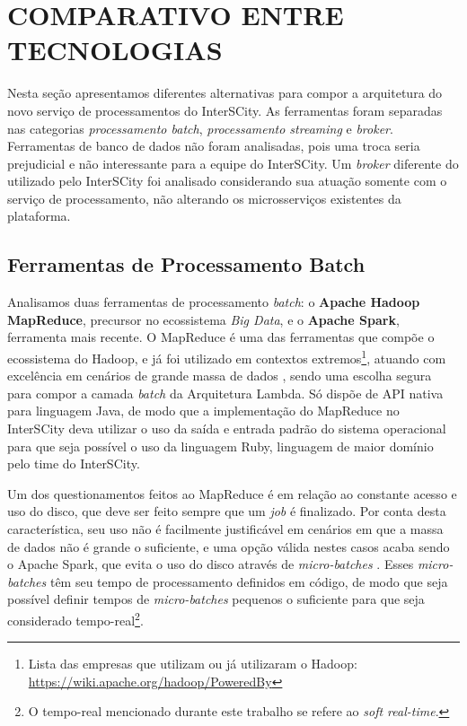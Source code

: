 \section{COMPARATIVO ENTRE TECNOLOGIAS}

Nesta seção apresentamos diferentes alternativas para compor a arquitetura do
novo serviço de processamentos do InterSCity. As ferramentas foram separadas
nas categorias \textit{processamento batch}, \textit{processamento streaming}
e \textit{broker}. Ferramentas de banco de dados não foram analisadas, pois
uma troca seria prejudicial e não interessante para a equipe do InterSCity.
Um \textit{broker} diferente do utilizado pelo InterSCity foi analisado
considerando sua atuação somente com o serviço de processamento, não alterando
os microsserviços existentes da plataforma.

\subsection{Ferramentas de Processamento Batch}

Analisamos duas ferramentas de processamento \textit{batch}: o
\textbf{Apache Hadoop MapReduce}, precursor no ecossistema \textit{Big Data},
e o \textbf{Apache Spark}, ferramenta mais recente. O MapReduce é uma das
ferramentas que compõe o ecossistema do Hadoop, e já foi utilizado em contextos
extremos\footnote{Lista das empresas que utilizam ou já
utilizaram o Hadoop: \url{https://wiki.apache.org/hadoop/PoweredBy}}, atuando
com excelência em cenários de grande massa de dados \cite{zaharia2008}, sendo
uma escolha segura para compor a camada \textit{batch} da Arquitetura
Lambda. Só dispõe de API nativa para linguagem Java, de modo que a
implementação do MapReduce no InterSCity deva utilizar o uso da saída e entrada
padrão do sistema operacional para que seja possível o uso da linguagem Ruby,
linguagem de maior domínio pelo time do InterSCity.

Um dos questionamentos feitos ao MapReduce é em relação ao constante acesso e
uso do disco, que deve ser feito sempre que um \textit{job} é finalizado. Por
conta desta característica, seu uso não é facilmente justificável em cenários em
que a massa de dados não é grande o suficiente, e uma opção válida nestes casos
acaba sendo o Apache Spark, que evita o uso do disco através de
\textit{micro-batches} \cite{arsalan2014}. Esses \textit{micro-batches} têm seu
tempo de processamento definidos em código, de modo que seja possível definir
tempos de \textit{micro-batches} pequenos o suficiente para que seja considerado
tempo-real\footnote{O tempo-real mencionado durante este trabalho se refere ao
\textit{soft real-time}.}.

